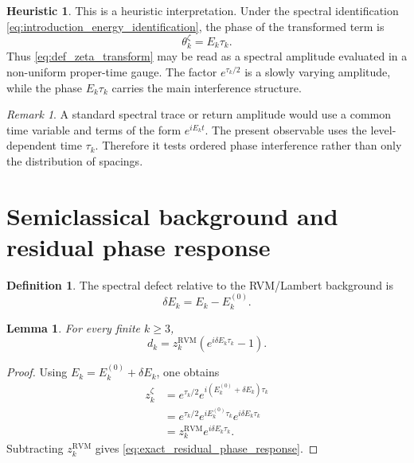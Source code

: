 \documentclass[11pt]{amsart}
\numberwithin{equation}{section}
\theoremstyle{plain}
\newtheorem{lemma}[theorem]{Lemma}
\theoremstyle{definition}
\newtheorem{definition}[theorem]{Definition}
\newtheorem{heuristic}[theorem]{Heuristic}
\theoremstyle{remark}
\newtheorem{remark}[theorem]{Remark}
\newcommand{\RVM}{\mathrm{RVM}}
\begin{document}
\begin{heuristic}
\label{heur:spectral_amplitude_view}
This is a heuristic interpretation.  Under the spectral identification \eqref{eq:introduction_energy_identification}, the phase of the transformed term is
\begin{equation}
\theta_k^\zeta
=
E_k\tau_k.
\label{eq:spectral_phase}
\end{equation}
Thus \eqref{eq:def_zeta_transform} may be read as a spectral amplitude evaluated in a non-uniform proper-time gauge.  The factor \(e^{\tau_k/2}\) is a slowly varying amplitude, while the phase \(E_k\tau_k\) carries the main interference structure.
\end{heuristic}

\begin{remark}
\label{rem:spectral_trace_difference}
A standard spectral trace or return amplitude would use a common time variable and terms of the form \(e^{iE_kt}\).  The present observable uses the level-dependent time \(\tau_k\).  Therefore it tests ordered phase interference rather than only the distribution of spacings.
\end{remark}

\section{Semiclassical background and residual phase response}
\label{sec:semiclassical_background_residual_response}

\begin{definition}
\label{def:spectral_defect}
The spectral defect relative to the RVM/Lambert background is
\begin{equation}
\delta E_k
=
E_k-E_k^{(0)}.
\label{eq:def_spectral_defect}
\end{equation}
\end{definition}

\begin{lemma}
\label{lem:exact_residual_phase_response}
For every finite \(k\geq 3\),
\begin{equation}
d_k
=
z_k^{\RVM}\left(e^{i\delta E_k\tau_k}-1\right).
\label{eq:exact_residual_phase_response}
\end{equation}
\end{lemma}

\begin{proof}
Using \(E_k=E_k^{(0)}+\delta E_k\), one obtains
\begin{align}
z_k^\zeta
&=
e^{\tau_k/2}e^{i(E_k^{(0)}+\delta E_k)\tau_k}
\label{eq:proof_residual_response_1}
\\
&=
e^{\tau_k/2}e^{iE_k^{(0)}\tau_k}e^{i\delta E_k\tau_k}
\label{eq:proof_residual_response_2}
\\
&=
z_k^{\RVM}e^{i\delta E_k\tau_k}.
\label{eq:proof_residual_response_3}
\end{align}
Subtracting \(z_k^{\RVM}\) gives \eqref{eq:exact_residual_phase_response}.
\end{proof}
\end{document}
